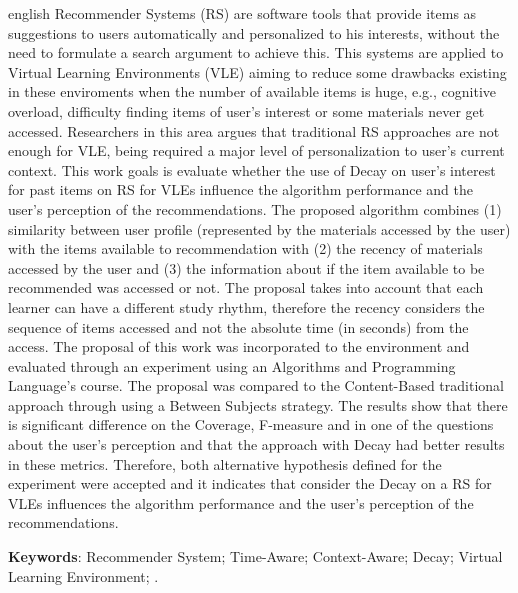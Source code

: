 \begin{resumo}[Abstract]
 \begin{otherlanguage*}{english}
  	Recommender Systems (RS) are software tools that provide items as suggestions to users automatically and personalized to his
    interests, without the need to formulate a search argument to achieve this. This systems are applied to Virtual Learning
    Environments (VLE) aiming to reduce some drawbacks existing in these enviroments when the number of available items is
    huge, e.g., cognitive overload, difficulty finding items of user's interest or some materials never get accessed. Researchers
    in this area argues that traditional RS approaches are not enough for VLE, being required a major level of personalization
    to user's current context. This work goals is evaluate whether the use of Decay on user's interest for past items
    on RS for VLEs influence the algorithm performance and the user's perception of the recommendations. The proposed
    algorithm combines (1) similarity between user profile (represented by the materials accessed by the user) with the items
    available to recommendation with (2) the recency of materials accessed by the user and (3) the information about if
    the item available to be recommended was accessed or not. The proposal takes into account that each learner can have
    a different study rhythm, therefore the recency considers the sequence of items accessed and not the absolute time (in
    seconds) from the access. The proposal of this work was incorporated to the \adaptwebspace environment and evaluated
    through an experiment using an Algorithms and Programming Language's course. The proposal was compared to the Content-Based traditional approach
    through using a Between Subjects strategy. The results show that there is significant difference on the Coverage,
    F-measure and in one of the questions about the user's perception and that the approach with Decay had better results
    in these metrics. Therefore, both alternative hypothesis defined for the experiment were accepted and it indicates
    that consider the Decay on a RS for VLEs influences the algorithm performance and the user's perception of the recommendations.
    \vspace{\onelineskip}

    \noindent
    \textbf{Keywords}: Recommender System; Time-Aware; Context-Aware; Decay; Virtual Learning Environment; \adaptweb.
 \end{otherlanguage*}
\end{resumo}

\listoffigures*
\cleardoublepage

\listoftables*
\cleardoublepage